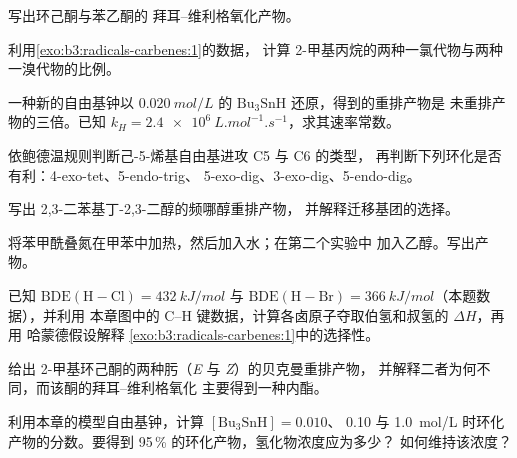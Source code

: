 \begin{exercise}[$\star$]\label{exo:b3:radicals-carbenes:4}
写出环己酮与苯乙酮的
拜耳–维利格氧化产物。
\end{exercise}

\begin{exercise}[$\star\star$]\label{exo:b3:radicals-carbenes:5}
利用\cref{exo:b3:radicals-carbenes:1}的数据，
计算 2-甲基丙烷的两种一氯代物与两种一溴代物的比例。
\end{exercise}

\begin{exercise}[$\star\star$]\label{exo:b3:radicals-carbenes:6}
一种新的自由基钟以 $\qty{0.020}{mol/L}$ 的 $\mathrm{Bu_3SnH}$ 还原，得到的重排产物是
未重排产物的三倍。已知 $k_H = \qty{2.4e6}{L.mol^{-1}.s^{-1}}$，求其速率常数。
\end{exercise}

\begin{exercise}[$\star\star$]\label{exo:b3:radicals-carbenes:7}
依鲍德温规则判断己-5-烯基自由基进攻 C5 与 C6 的类型，
再判断下列环化是否有利：4-exo-tet、5-endo-trig、
5-exo-dig、3-exo-dig、5-endo-dig。
\end{exercise}

\begin{exercise}[$\star\star$]\label{exo:b3:radicals-carbenes:8}
写出 2,3-二苯基丁-2,3-二醇的频哪醇重排产物，
并解释迁移基团的选择。
\end{exercise}

\begin{exercise}[$\star\star$]\label{exo:b3:radicals-carbenes:9}
将苯甲酰叠氮在甲苯中加热，然后加入水；在第二个实验中
加入乙醇。写出产物。
\end{exercise}

\begin{exercise}[$\star\star\star$]\label{exo:b3:radicals-carbenes:10}
已知 $\mathrm{BDE(H{-}Cl)} = \qty{432}{kJ/mol}$ 与 $\mathrm{BDE(H{-}Br)} = \qty{366}{kJ/mol}$（本题数据），并利用
本章图中的 C--H 键数据，计算各卤原子夺取伯氢和叔氢的 $\Delta H$，再用
哈蒙德假设解释
\cref{exo:b3:radicals-carbenes:1}中的选择性。
\end{exercise}

\begin{exercise}[$\star\star\star$]\label{exo:b3:radicals-carbenes:11}
给出 2-甲基环己酮的两种肟（\textit{E} 与 \textit{Z}）的贝克曼重排产物，
并解释二者为何不同，而该酮的拜耳–维利格氧化
主要得到一种内酯。
\end{exercise}

\begin{exercise}[$\star\star\star$]\label{exo:b3:radicals-carbenes:12}
利用本章的模型自由基钟，计算 $[\mathrm{Bu_3SnH}] = 0.010$、
0.10 与 \qty{1.0}{mol/L} 时环化产物的分数。要得到 95\,\% 的环化产物，氢化物浓度应为多少？
如何维持该浓度？
\end{exercise}


